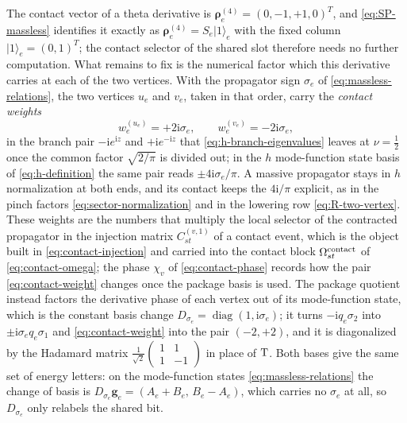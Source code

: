 \documentclass[11pt,a4paper]{article}
\newcommand{\ii}{\mathrm i}
\newcommand{\diag}{\operatorname{diag}}
\begin{document}
The contact vector of a theta derivative is $\bm\rho_e^{(4)}=(0,-1,+1,0)^T$, and
\eqref{eq:SP-massless} identifies it exactly as
$\bm\rho_e^{(4)}=S_e|1\rangle_e$ with the fixed column $|1\rangle_e=(0,1)^T$; the contact selector of
the shared slot therefore needs no further computation. What remains to fix is the numerical factor
which this derivative carries at each of the two vertices. With the propagator sign $\sigma_e$ of
\eqref{eq:massless-relations}, the two vertices $u_e$ and $v_e$, taken in that order, carry the
\emph{contact weights}
\begin{equation}
  w_{e}^{(u_e)}=+2\ii\sigma_e,\qquad w_{e}^{(v_e)}=-2\ii\sigma_e,
  \label{eq:contact-weight}
\end{equation}
in the branch pair $-\ii e^{\ii z}$ and $+\ii e^{-\ii z}$ that \eqref{eq:h-branch-eigenvalues} leaves
at $\nu=\tfrac12$ once the common factor $\sqrt{2/\pi}$ is divided out; in the $h$ mode-function
state basis of \eqref{eq:h-definition} the same pair reads $\pm4\ii\sigma_e/\pi$. A massive
propagator stays in $h$ normalization at both ends, and its contact keeps the $4\ii/\pi$ explicit, as
in the pinch factors \eqref{eq:sector-normalization} and in the lowering row
\eqref{eq:R-two-vertex}. These weights are the numbers that multiply the local
selector of the contracted propagator in the injection matrix $C^{(v,1)}_{st}$ of a contact event,
which is the object built in \eqref{eq:contact-injection} and carried into the contact block
$\Omega^{\rm contact}_{st}$ of \eqref{eq:contact-omega}; the phase $\chi_v$ of
\eqref{eq:contact-phase} records how the pair \eqref{eq:contact-weight} changes once the package
basis is used. The package quotient instead factors the derivative phase of each vertex out of its
mode-function state, which is the constant basis change
$D_{\sigma_e}=\diag(1,\ii\sigma_e)$; it turns $-\ii q_e\sigma_2$ into
$\pm\ii\sigma_eq_e\sigma_1$ and \eqref{eq:contact-weight} into the pair $(-2,+2)$, and it is
diagonalized by the Hadamard matrix
$\tfrac1{\sqrt2}\left(\begin{smallmatrix}1&1\\1&-1\end{smallmatrix}\right)$ in place of
$\text T$. Both bases give the same set of energy letters: on the mode-function states
\eqref{eq:massless-relations} the change of basis is
$D_{\sigma_e}\bm g_e=(A_e+B_e,\,B_e-A_e)$, which carries no $\sigma_e$ at all, so $D_{\sigma_e}$
only relabels the shared bit.
\end{document}
